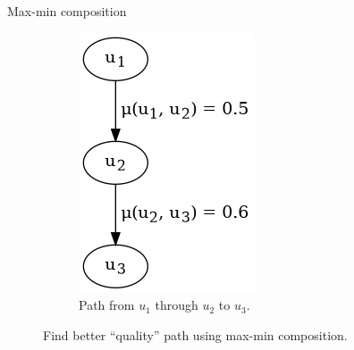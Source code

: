 \begin{frame}
\begin{block}{Max-min composition}
\begin{figure}[htbp]
\begin{subfigure}[t]{0.22\textwidth}
			\includegraphics[width=\linewidth,valign=t]{inc/fuzzy_graph_theory/maxmincomposition_after.png}
			\caption{Path from $u_1$ through $u_2$ to $u_3$.}
		\end{subfigure}
		\caption{Find better ``quality'' path using max-min composition.}
	\end{figure}

	\end{block}
\end{frame}
